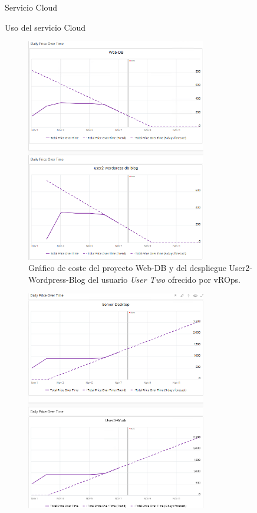 \begin{subsection}{Servicio Cloud}
\begin{subsubsection}{Uso del servicio Cloud}
\begin{figure}[h]
            \includegraphics[width=0.7\textwidth]{imaxes/pruebaconcepto/vrealize/vrops-graf-user2.png}
            \caption{Gráfico de coste del proyecto Web-DB y del despliegue User2-Wordpress-Blog del usuario \textit{User Two} ofrecido por vROps.}
            \label{fig:vrops-graf-user2}
        \end{figure}
        \FloatBarrier
        \begin{figure}[h]
            \centering
            \includegraphics[width=0.7\textwidth]{imaxes/pruebaconcepto/vrealize/vrops-graf-user3.png}

\end{figure}
\end{subsubsection}
\end{subsection}
